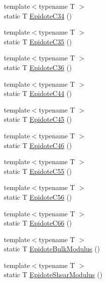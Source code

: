\begin{DoxyCompactItemize}
\item 
{\footnotesize template$<$typename T $>$ }\\static T \mbox{\hyperlink{namespacempc_1_1data_ae98ab6a66c0009d18adc18b52453c87f}{Epidote\+C34}} ()
\item 
{\footnotesize template$<$typename T $>$ }\\static T \mbox{\hyperlink{namespacempc_1_1data_a44b81ca494765b62a7ff847144bbf5dd}{Epidote\+C35}} ()
\item 
{\footnotesize template$<$typename T $>$ }\\static T \mbox{\hyperlink{namespacempc_1_1data_aea058006af58f5fba5e871c6534bb6d3}{Epidote\+C36}} ()
\item 
{\footnotesize template$<$typename T $>$ }\\static T \mbox{\hyperlink{namespacempc_1_1data_ae61ce2da81a5ece42488a95c78babd09}{Epidote\+C44}} ()
\item 
{\footnotesize template$<$typename T $>$ }\\static T \mbox{\hyperlink{namespacempc_1_1data_a60974a3577b9d3e19d09ae8d7b823a50}{Epidote\+C45}} ()
\item 
{\footnotesize template$<$typename T $>$ }\\static T \mbox{\hyperlink{namespacempc_1_1data_ad4290f8a184974775fc7edb5afcc36f2}{Epidote\+C46}} ()
\item 
{\footnotesize template$<$typename T $>$ }\\static T \mbox{\hyperlink{namespacempc_1_1data_acc1948d39dd8dbafd3cad2c4e721ef2c}{Epidote\+C55}} ()
\item 
{\footnotesize template$<$typename T $>$ }\\static T \mbox{\hyperlink{namespacempc_1_1data_a5f2faa4d324fde52f914feb7591044b6}{Epidote\+C56}} ()
\item 
{\footnotesize template$<$typename T $>$ }\\static T \mbox{\hyperlink{namespacempc_1_1data_ae3fb9bbdee9066b574eca0ddcf6d75c8}{Epidote\+C66}} ()
\item 
{\footnotesize template$<$typename T $>$ }\\static T \mbox{\hyperlink{namespacempc_1_1data_a3c1c59c385d6eace137c194c69244530}{Epidote\+Bulk\+Modulus}} ()
\item 
{\footnotesize template$<$typename T $>$ }\\static T \mbox{\hyperlink{namespacempc_1_1data_a711ec061eb6e213696d2a2c7d30858c2}{Epidote\+Shear\+Modulus}} ()
\item 

\end{DoxyCompactItemize}
